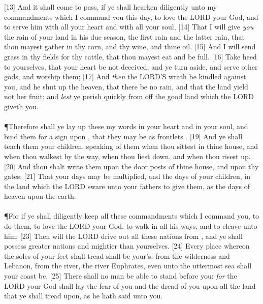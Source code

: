 [13] \textcolor[cmyk]{0.99998,1,0,0}{And it shall come to pass, if ye shall hearken diligently unto my commandments which I command you this day, to love the LORD your God, and to serve him with all your heart and with all your soul,}
[14] \textcolor[cmyk]{0.99998,1,0,0}{That I will give \emph{you} the rain of your land in his due season, the first rain and the latter rain, that thou mayest gather in thy corn, and thy wine, and thine oil.}
[15] \textcolor[cmyk]{0.99998,1,0,0}{And I will send grass in thy fields for thy cattle, that thou mayest eat and be full.}
[16] \textcolor[cmyk]{0.99998,1,0,0}{Take heed to yourselves, that your heart be not deceived, and ye turn aside, and serve other gods, and worship them;}
[17] \textcolor[cmyk]{0.99998,1,0,0}{And \emph{then} the LORD'S wrath be kindled against you, and he shut up the heaven, that there be no rain, and that the land yield not her fruit; and \emph{lest} ye perish quickly from off the good land which the LORD giveth you.}\\
\\
\P \textcolor[cmyk]{0.99998,1,0,0}{Therefore shall ye lay up these my words in your heart and in your soul, and bind them for a sign upon , that they may be as frontlets .}
[19] \textcolor[cmyk]{0.99998,1,0,0}{And ye shall teach them your children, speaking of them when thou sittest in thine house, and when thou walkest by the way, when thou liest down, and when thou risest up.}
[20] \textcolor[cmyk]{0.99998,1,0,0}{And thou shalt write them upon the door posts of thine house, and upon thy gates:}
[21] \textcolor[cmyk]{0.99998,1,0,0}{That your days may be multiplied, and the days of your children, in the land which the LORD sware unto your fathers to give them, as the days of heaven upon the earth.}\\
\\
\P \textcolor[cmyk]{0.99998,1,0,0}{For if ye shall diligently keep all these commandments which I command you, to do them, to love the LORD your God, to walk in all his ways, and to cleave unto him;}
[23] \textcolor[cmyk]{0.99998,1,0,0}{Then will the LORD drive out all these nations from , and ye shall possess greater nations and mightier than yourselves.}
[24] \textcolor[cmyk]{0.99998,1,0,0}{Every place whereon the soles of your feet shall tread shall be your's: from the wilderness and Lebanon, from the river, the river Euphrates, even unto the uttermost sea shall your coast be.}
[25] \textcolor[cmyk]{0.99998,1,0,0}{There shall no man be able to stand before you: \emph{for} the LORD your God shall lay the fear of you and the dread of you upon all the land that ye shall tread upon, as he hath said unto you.}\\
